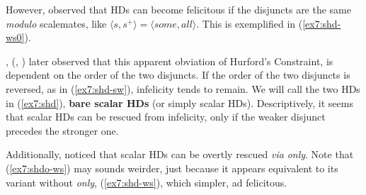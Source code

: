 \begin{exe}
	\ex\label{ex7:hd}
	\begin{xlist}
		\label{ex7:hd-ws}
		\label{ex7:hd-sw}
	\end{xlist}
\end{exe}

However, \citet{Gazdar1979} observed that HDs can become felicitous if the disjuncts are the same \textit{modulo} scalemates, like $\langle s, s^+ \rangle = \langle \textit{some}, \textit{all} \rangle$. This is exemplified in (\ref{ex7:shd-ws0}).


\begin{exe}
	\label{ex7:shd-ws0}
\end{exe}

\citeauthor{Singh2008}, (\citeyear{Singh2008a}, \citeyear{Singh2008b}) later observed that this apparent obviation of Hurford's Constraint, is dependent on the order of the two disjuncts. If the order of the two disjuncts is reversed, as in (\ref{ex7:shd-sw}), infelicity tends to remain. We will call the two HDs in (\ref{ex7:shd}), \textbf{bare scalar HDs} (or simply scalar HDs). Descriptively, it seems that scalar HDs can be rescued from infelicity, only if the weaker disjunct precedes the stronger one.


\begin{exe}
	\ex\label{ex7:shd}
	\begin{xlist}
		\label{ex7:shd-ws}
		\label{ex7:shd-sw}
	\end{xlist}
\end{exe}

Additionally, \citeauthor{Singh2008} noticed that scalar HDs can be overtly rescued \textit{via} \textit{only}. Note that (\ref{ex7:shdo-ws}) may sounds weirder, just because it appears equivalent to its variant without \textit{only}, (\ref{ex7:shd-ws}), which simpler, ad felicitous.

\begin{exe}
	\ex\label{ex7:shdo}
	\begin{xlist}
		\label{ex7:shdo-ws}
		\label{ex7:shdo-sw}
	\end{xlist}
\end{exe}

